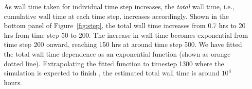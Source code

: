 \documentclass[letterpaper,11pt]{article}
\begin{document}
As wall time taken for individual time step increases, the {\em total} wall time, i.e., cumulative wall time at each time step, increases accordingly. Shown in the bottom panel of Figure~\ref{fig:step}, the total wall time increases from 0.7 hrs to 20 hrs from time step 50 to 200. The  increase in wall time becomes exponential from time step 200 onward, reaching 150 hrs at around time step 500. We have fitted the total wall time dependence as an exponential function (shown as orange dotted line). Extrapolating the fitted function to timestep 1300 where the simulation is expected to finish , the estimated total wall time is around $10^4$ hours. 



\end{document}
